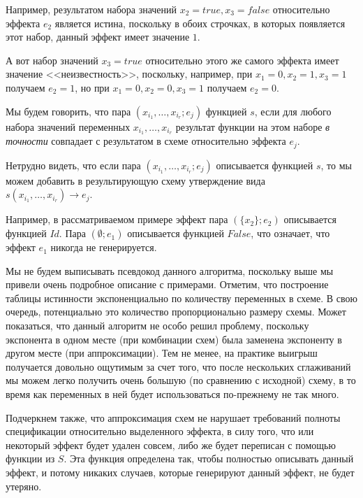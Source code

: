 \begin{framed}
	Например, результатом набора значений $x_2 = true, x_3 = false$ относительно эффекта $e_2$ является истина, поскольку в обоих строчках, в которых появляется этот набор, данный эффект имеет значение $1$.
	
	А вот набор значений $x_3 = true$ относительно этого же самого эффекта имеет значение <<неизвестность>>, поскольку, например, при $x_1 = 0, x_2 = 1, x_3 = 1$ получаем $e_2 = 1$, но при $x_1 = 0, x_2 = 0, x_3 = 1$ получаем $e_2 = 0$.
\end{framed}

Мы будем говорить, что пара $(x_{i_1}, \ldots, x_{i_r}; e_j)$  функцией $s$, если для любого набора значений переменных $x_{i_1}, \ldots, x_{i_r}$ результат функции на этом наборе \emph{в точности} совпадает с результатом в схеме относительно эффекта $e_j$. 

Нетрудно видеть, что если пара $(x_{i_1}, \ldots, x_{i_r}; e_j)$ описывается функцией $s$, то мы можем добавить в результирующую схему утверждение вида \\ $s(x_{i_1}, \ldots, x_{i_r}) \rightarrow e_j$.


\begin{framed}
	Например, в рассматриваемом примере эффект пара $(\{x_2\}; e_2)$ описывается функцией $Id$. Пара $(\emptyset; e_1)$ описывается функцией $False$, что означает, что эффект $e_1$ никогда не генерируется.
\end{framed}

\bigskip

Мы не будем выписывать псевдокод данного алгоритма, поскольку выше мы привели очень подробное описание с примерами. Отметим, что построение таблицы истинности экспоненциально по количеству переменных в схеме. В свою очередь, потенциально это количество пропорционально размеру схемы. Может показаться, что данный алгоритм не особо решил проблему, поскольку экспонента в одном месте (при комбинации схем) была заменена экспоненту в другом месте (при аппроксимации). Тем не менее, на практике выигрыш получается довольно ощутимым за счет того, что после нескольких сглаживаний мы можем легко получить очень большую (по сравнению с исходной) схему, в то время как переменных в ней будет использоваться по-прежнему не так много.

Подчеркнем также, что аппроксимация схем не нарушает требований полноты спецификации относительно выделенного эффекта, в силу того, что или некоторый эффект будет удален совсем, либо же будет переписан с помощью функции из $S$. Эта функция определена так, чтобы полностью описывать данный эффект, и потому никаких случаев, которые генерируют данный эффект, не будет утеряно.